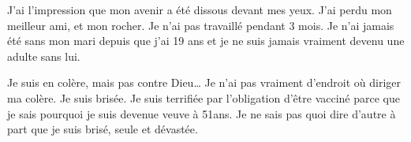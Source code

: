 J'ai l'impression que mon avenir a été dissous devant mes yeux. J'ai perdu mon
meilleur ami, et mon rocher. Je n'ai pas travaillé pendant 3 mois. Je n'ai
jamais été sans mon mari depuis que j'ai 19 ans et je ne suis jamais vraiment
devenu une adulte sans lui.

Je suis en colère, mais pas contre Dieu… Je n'ai pas vraiment d'endroit où
diriger ma colère. Je suis brisée. Je suis terrifiée par l'obligation d'être
vacciné parce que je sais pourquoi je suis devenue veuve à 51ans. Je ne sais pas
quoi dire d'autre à part que je suis brisé, seule et dévastée.

